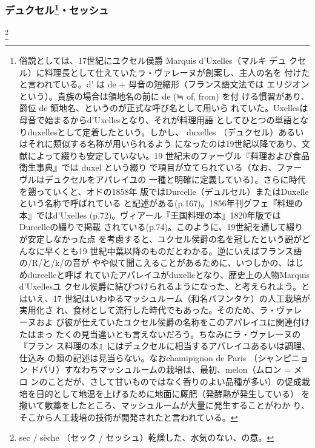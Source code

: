 \begin{recette}
{\subsubsection[デュクセル・セッシュ]{\texorpdfstring{デュクセル\footnote{俗説としては、17世紀にユクセル侯爵
  Marquis d'Uxelles（マルキ デュ
  クセル）に料理長として仕えていたラ・ヴァレーヌが創案し、主人の名を
  付けたと言われている。d' は de + 母音の短縮形（フランス語文法では
  エリジオンという）。貴族の場合は領地名の前に de (≒ of, from) を付
  ける慣習があり、爵位 de 領地名、というのが正式な呼び名として用いら
  れていた。Uxellesは母音で始まるからd'Uxellesとなり、それが料理用語
  としてひとつの単語となりduxellesとして定着したという。しかし、
  duxelles （デュクセル）あるいはそれに類似する名称が用いられるよう
  になったのは19世紀以降であり、文献によって綴りも安定していない。19
  世紀末のファーヴル『料理および食品衛生事典』では duxel という綴り
  で項目が立てられている（なお、ファーヴルはデュクセルをアパレイユの
  一種と明確に定義している）。さらに時代を遡っていくと、オドの1858年
  版ではDurcelle（デュルセル）またはDuxelleという名称で呼ばれている
  と記述がある(p.167)。1856年刊グフェ『料理の本』ではd'Uxelles
  (p.72)。ヴィアール『王国料理の本』1820年版ではDurcelleの綴りで掲載
  されている(p.74)。このように、19世紀を通して綴りが安定しなかった点
  を考慮すると、ユクセル侯爵の名を冠したという説がどんなに早くとも19
  世紀中葉以降のものだとわかる。逆にいえばフランス語の/R/と/k/の音が
  やや似て聞こえることがあるために、いつしかの、はじめdurcelleと呼ば
  れていたアパレイユがduxelleとなり、歴史上の人物Marquis d'Uxellesユ
  クセル侯爵に結びつけられるようになった、と考えられよう。とはいえ、17
  世紀はいわゆるマッシュルーム（和名バフンタケ）の人工栽培が実用化さ
  れ、食材として流行した時代でもあった。そのため、ラ・ヴァレーヌおよ
  び彼が仕えていたユクセル侯爵の名称をこのアパレイユに関連付けたはまっ
  たくの見当違いとも言えないだろう。ちなみにラ・ヴァレーヌの『フラン
  ス料理の本』にはデュクセルに相当するアパレイユあるいは調理、仕込み
  の類の記述は見当らない。なおchamipignon de Paris （シャンピニョン
  ドパリ）すなわちマッシュルームの栽培は、最初、melon（ムロン = メロ
  ンのことだが、さして甘いものではなく香りのよい品種が多い）の促成栽
  培を目的として地温を上げるために地面に厩肥（発酵熱が発生している）
  を撒いて敷藁をしたところ、マッシュルームが大量に発生することがわか
  り、そこから人工栽培の技術が開発されたと言われている。}・セッシュ}{デュクセル・セッシュ}}\label{duxelles-seche}}

\footnote{sec / sèche （セック /
  セッシュ）乾燥した、水気のない、の意。}


\end{recette}
